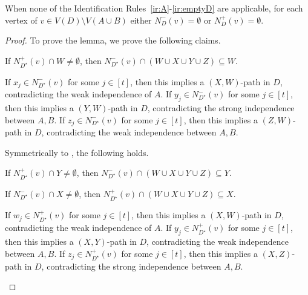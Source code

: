 \begin{lemma}\label{lem:ordered-cleaning-exhaustive}
When none of the Identification Rules~\ref{ir:A}-\ref{ir:emptyD} are applicable, for each vertex of $v \in V(D) \setminus V(A\cup B)$ either $N_D^-(v) =\emptyset$ or $N_D^+(v) = \emptyset$.
\end{lemma}
\begin{proof}
To prove the lemma, we prove the following claims.

\begin{claim}\label{claim:ordered-ir}
If $N_{D^{\star}}^+(v) \cap W \neq \emptyset$, then
$ N_{D^{\star}}^-(v) \cap (W \cup X \cup Y \cup Z) \subseteq W$. 
\end{claim}

\begin{claimproof}
If $x_j \in N_{D^{\star}}^-(v) $ for some $j \in [t]$, then this implies a $(X,W)$-path in $D$, contradicting the weak independence of $A$.
If $y_j \in N_{D^{\star}}^-(v)$ for some $j \in [t]$, then this implies a $(Y,W)$-path in $D$, contradicting the strong independence between $A,B$. 
If $z_j \in N_{D^{\star}}^-(v)$ for some $j \in [t]$, then this implies a $(Z,W)$-path in $D$, contradicting the weak independence between $A,B$. 
\end{claimproof}

Symmetrically to , the following holds.

\begin{claim}\label{claim:ordered-ir2}
If $N_{D^{\star}}^+(v) \cap Y \neq \emptyset$, then
$ N_{D^{\star}}^-(v) \cap (W \cup X \cup Y \cup Z) \subseteq Y$. 
\end{claim}

\begin{claim}\label{claim:ordered-ir3}
If $N_{D^{\star}}^-(v) \cap X \neq \emptyset$, then
$ N_{D^{\star}}^+(v) \cap (W \cup X \cup Y \cup Z) \subseteq X$. 
\end{claim}

\begin{claimproof}
If $w_j \in N_{D^{\star}}^+(v) $ for some $j \in [t]$, then this implies a $(X,W)$-path in $D$, contradicting the weak independence of $A$.
If $y_j \in N_{D^{\star}}^+(v)$ for some $j \in [t]$, then this implies a $(X,Y)$-path in $D$, contradicting the weak independence between $A,B$. 
If $z_j \in N_{D^{\star}}^+(v)$ for some $j \in [t]$, then this implies a $(X,Z)$-path in $D$, contradicting the strong independence between $A,B$. 
\end{claimproof}


\end{proof}

